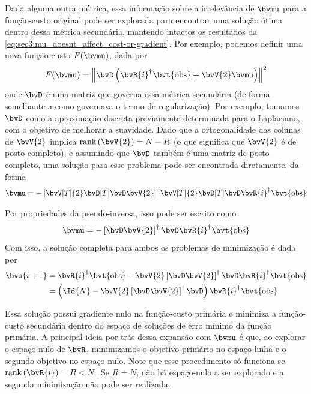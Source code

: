 Dada alguma outra métrica, essa informação sobre a irrelevância de $\bvmu$ para a função-custo original pode ser explorada para encontrar uma solução ótima dentro dessa métrica secundária, mantendo intactos os resultados da \cref{eq:sec3:mu_doesnt_affect_cost-or-gradient}. Por exemplo, podemos definir uma nova função-custo $F(\bvmu)$, dada por
\begin{equation}
	F(\bvmu) = \norm{\bvD \pts{\pinv{\bvR{i}} \bvt{\obs} + \bvV{2}\bvmu}}^2
	\label{eq:sec3:cost_function_mu}
\end{equation}
onde $\bvD$ é uma matriz que governa essa métrica secundária (de forma semelhante a como governava o termo de regularização). Por exemplo, tomamos $\bvD$ como a aproximação discreta previamente determinada para o Laplaciano, com o objetivo de melhorar a suavidade. Dado que a ortogonalidade das colunas de $\bvV{2}$ implica $\rank{\bvV{2}} = N-R$ (o que significa que $\bvV{2}$ é de posto completo), e assumindo que $\bvD$ também é uma matriz de posto completo, uma solução para esse problema pode ser encontrada diretamente, da forma
\begin{equation}
	\bvmu = -\inv*{\bvV[T]{2} \bvD[T] \bvD\bvV{2}} \bvV[T]{2} \bvD[T] \bvD \pinv{\bvR{i}} \bvt{\obs}
\end{equation}

Por propriedades da pseudo-inversa, isso pode ser escrito como
\begin{equation}
	\bvmu = -\pinv*{\bvD \bvV{2}} \bvD \pinv{\bvR{i}} \bvt{\obs}
	\label{eq:sec2:definition_mu_full}
\end{equation}
Com isso, a solução completa para ambos os problemas de minimização é dada por
\begin{equation}
	\begin{split}
		\bvs{i+1}
		& = \pinv{\bvR{i}} \bvt{\obs} - \bvV{2} \pinv*{\bvD \bvV{2}} \bvD \pinv{\bvR{i}} \bvt{\obs} \\
		& = \pts{\Id{N} - \bvV{2} \pinv*{\bvD \bvV{2}} \bvD} \pinv{\bvR{i}} \bvt{\obs}
	\end{split}
	\label{eq:sec2:definition_zi+1_with_mu}
\end{equation}

Essa solução possui gradiente nulo na função-custo primária e minimiza a função-custo secundária dentro do espaço de soluções de erro mínimo da função primária. A principal ideia por trás dessa expansão com $\bvmu$ é que, ao explorar o espaço-nulo de $\bvR$, minimizamos o objetivo primário no espaço-linha e o segundo objetivo no espaço-nulo. Note que esse procedimento só funciona se $\rank{\bvR{i}} = R < N$. Se $R = N$, não há espaço-nulo a ser explorado e a segunda minimização não pode ser realizada.

